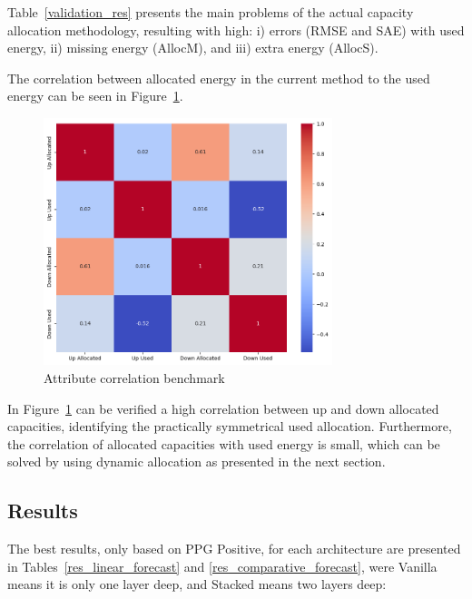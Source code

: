 

Table~\ref{validation_res} presents the main problems of the actual capacity allocation methodology, resulting with high: i) errors (RMSE and SAE) with used energy, ii) missing energy (AllocM), and iii) extra energy (AllocS).

The correlation between allocated energy in the current method to the used energy can be seen in Figure~\ref{fig:Attribute_correlation_benchmark}.

\begin{figure}[H]
    \centering
    \includegraphics[width=0.75\textwidth]{plots/correlation_heatmap_benchmark.png}
    \caption{Attribute correlation benchmark}
    \label{fig:Attribute_correlation_benchmark}
  \end{figure}

In Figure~\ref{fig:Attribute_correlation_benchmark} can be verified a high correlation between up and down allocated capacities, identifying the practically symmetrical used allocation.
%
Furthermore, the correlation of allocated capacities with used energy is small, which can be solved by using dynamic allocation as presented in the next section.

\subsection{Results}

The best results, only based on PPG Positive, for each architecture are presented in Tables~\ref{res_linear_forecast} and \ref{res_comparative_forecast}, were Vanilla means it is only one layer deep, and Stacked means two layers deep:



